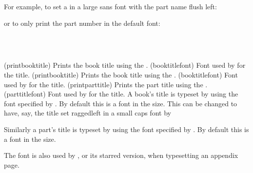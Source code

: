     For example, to set a \cmd{\part} in a large sans font with the part
name flush left:
\begin{lcode}
\renewcommand{\partnamefont}{\normalfont\huge\sffamily\raggedright}
\renewcommand{\partnumfont}{\normalfont\huge\sffamily}
\end{lcode}
or to only print the part number in the default font:
\begin{lcode}
\renewcommand{\printpartname}{}
\renewcommand{\partnamenum}{}
\end{lcode}


\begin{syntax}
\cmd{\printbooktitle} \cmd{\booktitlefont} \\
\cmd{\printparttitle} \cmd{\parttitlefont} \\
\end{syntax}
\glossary(printbooktitle)%
  {}%
  {Prints the book title using the .}
\glossary(booktitlefont)%
  {}%
  {Font used by  for the title.}
\glossary(printbooktitle)%
  {}%
  {Prints the book title using the .}
\glossary(booktitlefont)%
  {}%
  {Font used by  for the title.}
\glossary(printparttitle)%
  {}%
  {Prints the part title using the .}
\glossary(parttitlefont)%
  {}%
  {Font used by  for the title.}
A book's title is typeset by \cmd{\printbooktitle} using the font specified
by \cmd{\booktitlefont}.
By default this is a \cmd{\bfseries} font in the \cmd{\Huge} size. This can
be changed to have, say, the title set raggedleft in a small caps font by
\begin{lcode}
\renewcommand{\booktitlefont}{\normalfont\Huge\scshape\raggedleft}
\end{lcode}

    Similarly a part's title is typeset by \cmd{\printparttitle} using
the font specified by \cmd{\parttitlefont}.
By default this is a \cmd{\bfseries} font in the \cmd{\Huge} size.

    The \cmd{\parttitlefont} font is also used by
\cmd{\appendixpage}, or its starred version, when
typesetting an appendix page.

